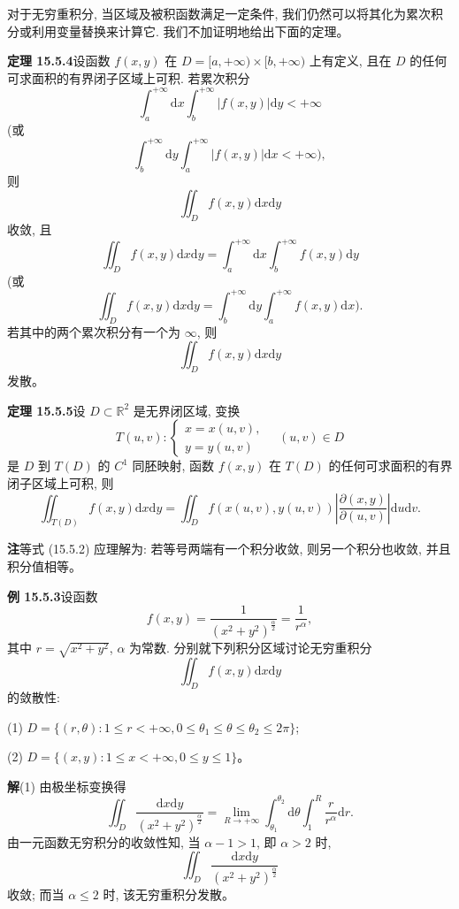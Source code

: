 \documentclass[UTF8,12pt,a4paper,fontset=fandol]{ctexart}
\begin{document}
对于无穷重积分, 当区域及被积函数满足一定条件, 我们仍然可以将其化为累次积分或利用变量替换来计算它. 我们不加证明地给出下面的定理。

\noindent\textbf{定理 15.5.4}\quad 设函数 $f(x,y)$ 在 $D=[a,+\infty)\times[b,+\infty)$ 上有定义, 且在 $D$ 的任何可求面积的有界闭子区域上可积. 若累次积分
\[
  \int_a^{+\infty}\mathrm dx\int_b^{+\infty}|f(x,y)|\mathrm dy<+\infty
\]
(或
\[
  \int_b^{+\infty}\mathrm dy\int_a^{+\infty}|f(x,y)|\mathrm dx<+\infty),
\]
则
\[
  \iint_D f(x,y)\mathrm dx\mathrm dy
\]
收敛, 且
\[
  \iint_D f(x,y)\mathrm dx\mathrm dy
  =\int_a^{+\infty}\mathrm dx\int_b^{+\infty}f(x,y)\mathrm dy
\]
(或
\[
  \iint_D f(x,y)\mathrm dx\mathrm dy
  =\int_b^{+\infty}\mathrm dy\int_a^{+\infty}f(x,y)\mathrm dx).
\]
若其中的两个累次积分有一个为 $\infty$, 则
\[
  \iint_D f(x,y)\mathrm dx\mathrm dy
\]
发散。

\noindent\textbf{定理 15.5.5}\quad 设 $D\subset\mathbb R^2$ 是无界闭区域, 变换
\[
  T(u,v):
  \begin{cases}
    x=x(u,v),\\
    y=y(u,v)
  \end{cases}
  \quad (u,v)\in D
\]
是 $D$ 到 $T(D)$ 的 $C^1$ 同胚映射, 函数 $f(x,y)$ 在 $T(D)$ 的任何可求面积的有界闭子区域上可积, 则
\begin{equation}
  \iint_{T(D)}f(x,y)\mathrm dx\mathrm dy
  =\iint_D f(x(u,v),y(u,v))
  \left|\frac{\partial(x,y)}{\partial(u,v)}\right|\mathrm du\mathrm dv.
  \tag{15.5.2}
\end{equation}

\noindent\textbf{注}\quad 等式 (15.5.2) 应理解为: 若等号两端有一个积分收敛, 则另一个积分也收敛, 并且积分值相等。

\noindent\textbf{例 15.5.3}\quad 设函数
\[
  f(x,y)=\frac1{(x^2+y^2)^{\frac\alpha2}}=\frac1{r^\alpha},
\]
其中 $r=\sqrt{x^2+y^2}$, $\alpha$ 为常数. 分别就下列积分区域讨论无穷重积分
\[
  \iint_D f(x,y)\mathrm dx\mathrm dy
\]
的敛散性:

(1) $D=\{(r,\theta):1\leqslant r<+\infty,0\leqslant\theta_1\leqslant\theta\leqslant\theta_2\leqslant2\pi\}$;

(2) $D=\{(x,y):1\leqslant x<+\infty,0\leqslant y\leqslant1\}$。

\noindent\textbf{解}\quad (1) 由极坐标变换得
\[
  \iint_D\frac{\mathrm dx\mathrm dy}{(x^2+y^2)^{\frac\alpha2}}
  =\lim_{R\to+\infty}\int_{\theta_1}^{\theta_2}\mathrm d\theta
  \int_1^R\frac r{r^\alpha}\mathrm dr.
\]
由一元函数无穷积分的收敛性知, 当 $\alpha-1>1$, 即 $\alpha>2$ 时,
\[
  \iint_D\frac{\mathrm dx\mathrm dy}{(x^2+y^2)^{\frac\alpha2}}
\]
收敛; 而当 $\alpha\leqslant2$ 时, 该无穷重积分发散。
\end{document}
